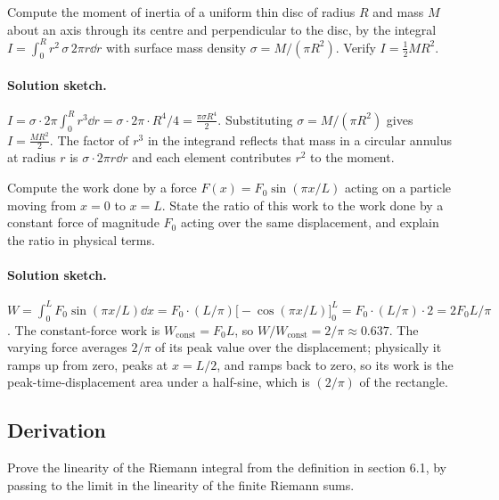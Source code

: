 \begin{exercise}
Compute the moment of inertia of a uniform thin disc of radius $R$
and mass $M$ about an axis through its centre and perpendicular to
the disc, by the integral $I = \int_{0}^{R} r^{2} \, \sigma \, 2 \pi
r \dd r$ with surface mass density $\sigma = M/(\pi R^{2})$.
Verify $I = \tfrac{1}{2} M R^{2}$.
\end{exercise}

\paragraph{Solution sketch.}
$I = \sigma \cdot 2\pi \int_{0}^{R} r^{3} \dd r = \sigma \cdot 2
\pi \cdot R^{4}/4 = \tfrac{\pi \sigma R^{4}}{2}$. Substituting
$\sigma = M/(\pi R^{2})$ gives $I = \tfrac{M R^{2}}{2}$. The
factor of $r^{3}$ in the integrand reflects that mass in a
circular annulus at radius $r$ is $\sigma \cdot 2\pi r \dd r$ and
each element contributes $r^{2}$ to the moment.

\begin{exercise}
Compute the work done by a force $F(x) = F_{0} \sin(\pi x / L)$
acting on a particle moving from $x = 0$ to $x = L$. State the
ratio of this work to the work done by a constant force of
magnitude $F_{0}$ acting over the same displacement, and explain
the ratio in physical terms.
\end{exercise}

\paragraph{Solution sketch.}
$W = \int_{0}^{L} F_{0} \sin(\pi x / L) \dd x = F_{0} \cdot
(L/\pi)\bigl[-\cos(\pi x / L)\bigr]_{0}^{L} = F_{0} \cdot (L/\pi)
\cdot 2 = 2 F_{0} L / \pi$. The constant-force work is
$W_{\mathrm{const}} = F_{0} L$, so $W/W_{\mathrm{const}} = 2/\pi
\approx 0.637$. The varying force averages $2/\pi$ of its peak
value over the displacement; physically it ramps up from zero,
peaks at $x = L/2$, and ramps back to zero, so its work is the
peak-time-displacement area under a half-sine, which is
$(2/\pi)$ of the rectangle.

\subsection*{Derivation}

\begin{exercise}
Prove the linearity of the Riemann integral from the definition
in section 6.1, by passing to the limit in the linearity of the
finite Riemann sums.
\end{exercise}

